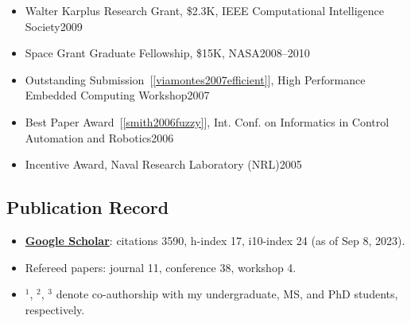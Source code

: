 \documentclass[11pt]{article}
\newcommand{\mygooglescholar}{\href{https://scholar.google.com/citations?user=TLcVQ-MAAAAJ}{Google Scholar}}
\begin{document}
\begin{itemize}
\item Walter Karplus Research Grant, \$2.3K, IEEE Computational Intelligence Society\hfill 2009 
\item Space Grant Graduate Fellowship, \$15K, NASA\hfill 2008--2010 
\item Outstanding Submission~[\ref{viamontes2007efficient}], High Performance Embedded Computing Workshop\hfill 2007
\item  Best Paper Award~[\ref{smith2006fuzzy}],  Int. Conf. on Informatics in Control Automation and Robotics\hfill 2006
\item Incentive Award,  Naval Research Laboratory (NRL)\hfill 2005
\end{itemize}

\subsection{Publication Record}

\begin{itemize}[label={},before=\small]
\item \textbf{\mygooglescholar{}}: citations 3590, h-index 17, i10-index 24 (as of Sep 8, 2023).
\item Refereed papers:  journal 11, conference 38, workshop 4.
\item \(^1\), \(^2\), \(^3\) denote co-authorship with my undergraduate, MS, and PhD students, respectively.
\end{itemize}
\end{document}
